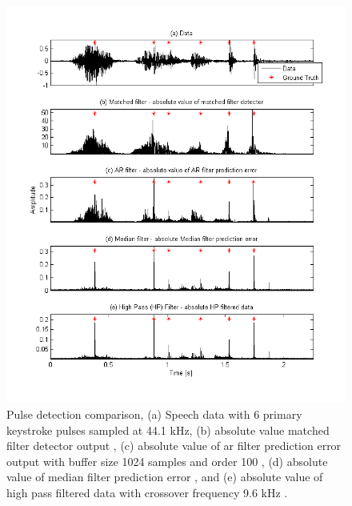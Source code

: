 \begin{figure}[!] %
\centering
\includegraphics[width=130mm]{LitRev_DetectCompareNew.png}
\caption{Pulse detection comparison, (a) Speech data with 6 primary keystroke pulses sampled at 44.1 kHz, (b) absolute value matched filter detector output \DIFaddbeginFL {}\DIFaddendFL , (c) absolute value of \DIFdelbeginFL {}\DIFdelendFL \DIFaddbeginFL \gls{ar} \DIFaddendFL filter prediction error output with buffer size 1024 samples and order 100 \DIFaddbeginFL {}\DIFaddendFL , (d) absolute value of median filter prediction error \DIFaddbeginFL {}\DIFaddendFL , and (e) absolute value of high pass filtered data with crossover frequency 9.6 kHz \DIFaddbeginFL {}\DIFaddendFL .}
\label{fig:LitRev_DetectCompare}
\end{figure}

